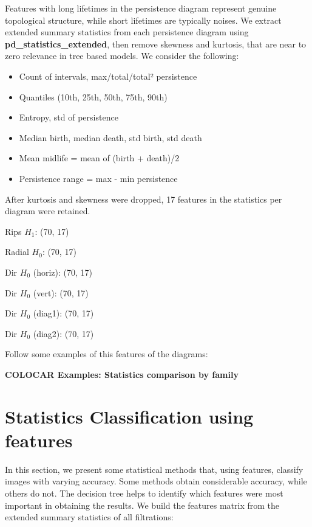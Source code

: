 \documentclass{birkjour}
\theoremstyle{definition}
\theoremstyle{remark}
\numberwithin{equation}{section}
\begin{document}
Features with long lifetimes in the persistence diagram represent genuine topological structure, while short lifetimes are typically noises.
We extract extended summary statistics from each persistence diagram using 
\linebreak\textbf{pd\_statistics\_extended}, then remove skewness and kurtosis, that are near to zero relevance in tree based models. We consider the following:
{\bf
\begin{itemize}

\item Count of intervals, max/total/total² persistence

\item Quantiles (10th, 25th, 50th, 75th, 90th)

\item Entropy, std of persistence

\item Median birth, median death, std birth, std death

\item Mean midlife = mean of (birth + death)/2

\item Persistence range = max - min persistence
\end{itemize}}

After kurtosis and skewness were dropped, 17 features in the statistics per diagram were retained.


  Rips \(H_1\): (70, 17)
  
  Radial \(H_0\): (70, 17)
  
  Dir \(H_0\) (horiz): (70, 17)
  
  Dir \(H_0\) (vert): (70, 17)
  
  Dir \(H_0\) (diag1): (70, 17)
  
  Dir \(H_0\) (diag2): (70, 17)

Follow some examples of this features of the diagrams:

\noindent \textbf{COLOCAR Examples: Statistics comparison by family}


\section{Statistics Classification using features}\quad

In this section, we present some statistical methods that, using features, classify images with varying accuracy. Some methods obtain considerable accuracy, while others do not. The decision tree helps to identify which features were most important in obtaining the results.
We build the features matrix from the extended summary statistics of all filtrations:
\end{document}
